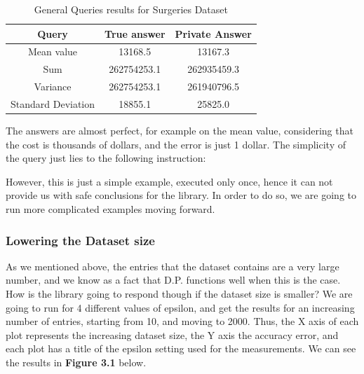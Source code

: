 \begin{table}[!htb]
    \centering
    \caption{General Queries results for Surgeries Dataset}
    \label{numbers}

    \begin{tabular}{| c | c | c |}
      \hline 
      Query & True answer & Private Answer \\
      \hline
      Mean value & 13168.5 & 13167.3 \\
      \hline
      Sum & 262754253.1 &  262935459.3 \\
      \hline
      Variance & 262754253.1 & 261940796.5\\
      \hline
      Standard Deviation & 18855.1 & 25825.0\\
      \hline
    \end{tabular}

\end{table}


The answers are almost perfect, for example on the mean value, considering that the cost is thousands of dollars, and the error is just 1 dollar. The simplicity of the query just lies to the following instruction:

However, this is just a simple example, executed only once, hence it can not provide us with safe conclusions for the library. In order to do so, we are going to run more complicated examples moving forward.

\subsubsection{Lowering the Dataset size}

As we mentioned above, the entries that the dataset contains are a very large number, and we know as a fact that D.P. functions well when this is the case. How is the library going to respond though if the dataset size is smaller? We are going to run for 4 different values of epsilon, and get the results for an increasing number of entries, starting from 10, and moving to 2000. Thus, the X axis of each plot represents the increasing dataset size, the Y axis the accuracy error, and each plot has a title of the epsilon setting used for the measurements. We can see the results in \textbf{Figure 3.1} below.

